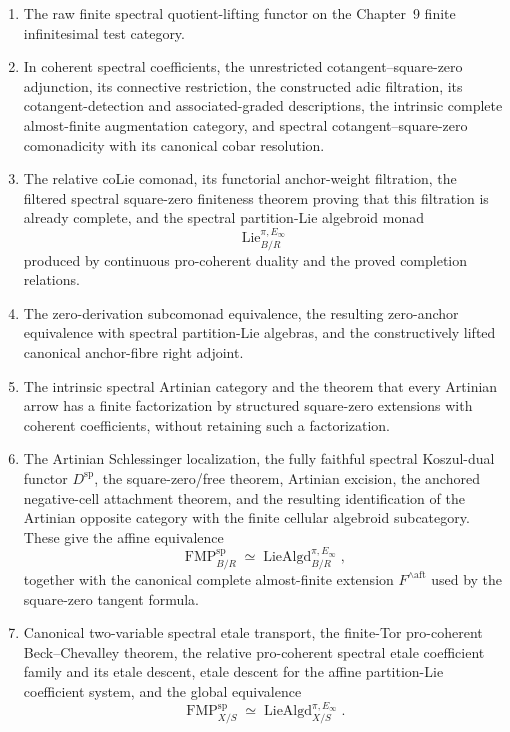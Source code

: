 \begin{theorem}
\begin{enumerate}
    \item The raw finite spectral quotient-lifting functor on the Chapter~9
    finite infinitesimal test category.

    \item In coherent spectral coefficients, the unrestricted
    cotangent--square-zero adjunction, its connective restriction, the
    constructed adic filtration, its cotangent-detection and associated-graded
    descriptions, the intrinsic complete almost-finite augmentation category,
    and spectral cotangent--square-zero comonadicity with its canonical cobar
    resolution.

    \item The relative coLie comonad, its functorial anchor-weight filtration,
    the filtered spectral square-zero finiteness theorem proving that this
    filtration is already complete, and the spectral partition-Lie algebroid
    monad
    \[
        \operatorname{Lie}^{\pi,E_\infty}_{B/R}
    \]
    produced by continuous pro-coherent duality and the proved completion
    relations.

    \item The zero-derivation subcomonad equivalence, the resulting zero-anchor
    equivalence with spectral partition-Lie algebras, and the constructively
    lifted canonical anchor-fibre right adjoint.

    \item The intrinsic spectral Artinian category and the theorem that every
    Artinian arrow has a finite factorization by structured square-zero
    extensions with coherent coefficients, without retaining such a
    factorization.

    \item The Artinian Schlessinger localization, the fully faithful spectral
    Koszul-dual functor $D^{\mathrm{sp}}$, the square-zero/free theorem,
    Artinian excision, the anchored negative-cell attachment theorem, and the
    resulting identification of the Artinian opposite category with the
    finite cellular algebroid subcategory.  These give the affine equivalence
    \[
        \operatorname{FMP}^{\mathrm{sp}}_{B/R}
        \simeq
        \operatorname{LieAlgd}^{\pi,E_\infty}_{B/R},
    \]
    together with the canonical complete almost-finite extension
    $F^{\wedge\mathrm{aft}}$ used by the square-zero tangent formula.

    \item Canonical two-variable spectral etale transport, the finite-Tor
    pro-coherent Beck--Chevalley theorem, the relative pro-coherent spectral
    etale coefficient family and its etale descent, etale descent for the
    affine partition-Lie coefficient system, and the global
    equivalence
    \[
        \operatorname{FMP}^{\mathrm{sp}}_{X/S}
        \simeq
        \operatorname{LieAlgd}^{\pi,E_\infty}_{X/S}.
    \]


\end{enumerate}
\end{theorem}
